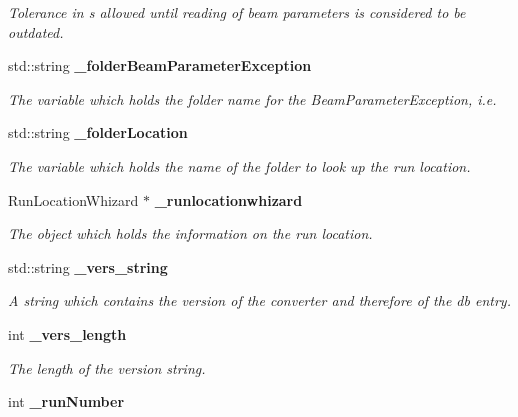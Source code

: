 \begin{DoxyCompactItemize}
\begin{DoxyCompactList}\small\item\em Tolerance in s allowed until reading of beam parameters is considered to be outdated. \item\end{DoxyCompactList}\item 
std::string {\bf \_\-folderBeamParameterException}
\begin{DoxyCompactList}\small\item\em The variable which holds the folder name for the BeamParameterException, i.e. \item\end{DoxyCompactList}\item 
std::string {\bf \_\-folderLocation}\label{classmarlin_1_1RunInfoProcessor_a1570d9cda3d532a23820e09b9da4210d}

\begin{DoxyCompactList}\small\item\em The variable which holds the name of the folder to look up the run location. \item\end{DoxyCompactList}\item 
RunLocationWhizard $\ast$ {\bf \_\-runlocationwhizard}\label{classmarlin_1_1RunInfoProcessor_a04731b4d9bb5e6635449ae5e997ea54e}

\begin{DoxyCompactList}\small\item\em The object which holds the information on the run location. \item\end{DoxyCompactList}\item 
std::string {\bf \_\-vers\_\-string}\label{classmarlin_1_1RunInfoProcessor_a281b035be172c5f29b4406256e6ff660}

\begin{DoxyCompactList}\small\item\em A string which contains the version of the converter and therefore of the db entry. \item\end{DoxyCompactList}\item 
int {\bf \_\-vers\_\-length}\label{classmarlin_1_1RunInfoProcessor_ab39f8a9b1988e14a2aeb1879d2ff2eab}

\begin{DoxyCompactList}\small\item\em The length of the version string. \item\end{DoxyCompactList}\item 
int {\bf \_\-runNumber}\label{classmarlin_1_1RunInfoProcessor_ac765ef550fc7ae185901ab1766afd0f8}


\end{DoxyCompactItemize}
